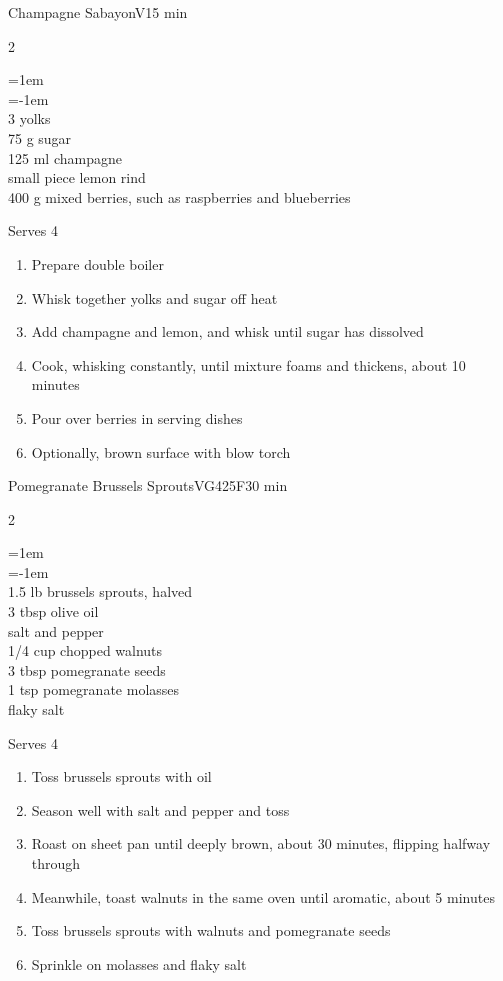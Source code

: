 \documentclass{article}
\newenvironment{recipe}[3][]
    {\begin{cardbase}[#1]{#2}{#3}
    \columnratio{0.333}
    \begin{paracol}{2}}
    {\end{paracol}\end{cardbase}}
\newcommand{\nextcolumn}{\switchcolumn}
\newenvironment{ingredients}
    {
    \begin{obeylines}
    \vspace{\parskip}
    \setlength{\parskip}{0.25em}
    \vspace{-0.25em}
    \leftskip=1em
    \parindent=-1em}
    {\end{obeylines}}
\newenvironment{steps}
    {\begin{enumerate}[leftmargin=*,topsep=0pt]}
    {\end{enumerate}}
\newcommand{\fahrenheit}[1]{#1\textdegree{}F}
\newcommand{\tag}[1]{\hspace{1em}#1}
\newcommand{\symboltag}[2]{\tag{#1\hspace{0.4em}#2}}
\newcommand{\totaltime}[1]{\symboltag{\raisebox{-0.1em}{\small\StopWatchEnd}}{#1}}
\newcommand{\preheat}[1]{\symboltag{\Topbottomheat}{#1}}
\begin{document}
\begin{recipe}{Champagne Sabayon}{\tag{V}\totaltime{15 min}}
\begin{ingredients}
3 yolks
75 g sugar
125 ml champagne
small piece lemon rind
400 g mixed berries, such as raspberries and blueberries
\end{ingredients}
\nextcolumn
Serves 4
\begin{steps}
    \item Prepare double boiler
    \item Whisk together yolks and sugar off heat
    \item Add champagne and lemon, and whisk until sugar has dissolved
    \item Cook, whisking constantly, until mixture foams and thickens, about 10 minutes
    \item Pour over berries in serving dishes
    \item Optionally, brown surface with blow torch
\end{steps}
\end{recipe}

\begin{recipe}{Pomegranate Brussels Sprouts}{\tag{VG}\preheat{\fahrenheit{425}}\totaltime{30 min}}
\begin{ingredients}
1.5 lb brussels sprouts, halved
3 tbsp olive oil
salt and pepper
1/4 cup chopped walnuts
3 tbsp pomegranate seeds
1 tsp pomegranate molasses
flaky salt
\end{ingredients}
\nextcolumn
Serves 4
\begin{steps}
    \item Toss brussels sprouts with oil
    \item Season well with salt and pepper and toss
    \item Roast on sheet pan until deeply brown, about 30 minutes, flipping halfway through
    \item Meanwhile, toast walnuts in the same oven until aromatic, about 5 minutes
    \item Toss brussels sprouts with walnuts and pomegranate seeds
    \item Sprinkle on molasses and flaky salt
\end{steps}
\end{recipe}
\end{document}
